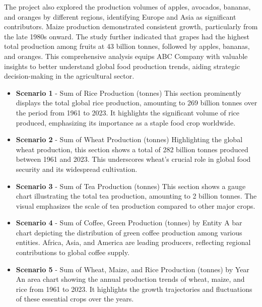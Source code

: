 \documentclass{article}
\begin{document}
The project also explored the production volumes of apples, avocados, bananas, and oranges by different regions, identifying Europe and Asia as significant contributors. Maize production demonstrated consistent growth, particularly from the late 1980s onward. The study further indicated that grapes had the highest total production among fruits at 43 billion tonnes, followed by apples, bananas, and oranges. This comprehensive analysis equips ABC Company with valuable insights to better understand global food production trends, aiding strategic decision-making in the agricultural sector. \\

\begin{itemize}

\item \textbf{Scenario 1} - Sum of Rice Production (tonnes)
This section prominently displays the total global rice production, amounting to 269 billion tonnes over the period from 1961 to 2023. It highlights the significant volume of rice produced, emphasizing its importance as a staple food crop worldwide. \\


\item \textbf{Scenario 2} - Sum of Wheat Production (tonnes)
Highlighting the global wheat production, this section shows a total of 282 billion tonnes produced between 1961 and 2023. This underscores wheat's crucial role in global food security and its widespread cultivation. \\

\item \textbf{Scenario 3} - Sum of Tea Production (tonnes)
This section shows a gauge chart illustrating the total tea production, amounting to 2 billion tonnes. The visual emphasizes the scale of tea production compared to other major crops. \\

\item \textbf{Scenario 4} - Sum of Coffee, Green Production (tonnes) by Entity
A bar chart depicting the distribution of green coffee production among various entities. Africa, Asia, and America are leading producers, reflecting regional contributions to global coffee supply. \\


\item \textbf{Scenario 5} - Sum of Wheat, Maize, and Rice Production (tonnes) by Year
An area chart showing the annual production trends of wheat, maize, and rice from 1961 to 2023. It highlights the growth trajectories and fluctuations of these essential crops over the years. \\


\end{itemize}
\end{document}
